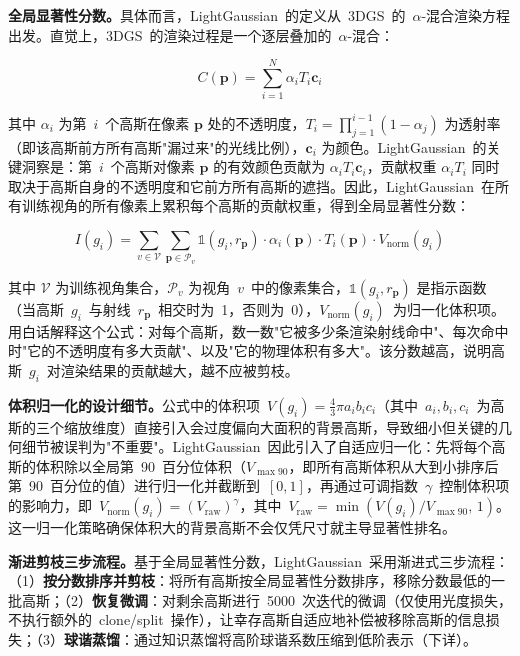 \textbf{全局显著性分数。}具体而言，LightGaussian~的定义从~3DGS~的~$\alpha$-混合渲染方程出发。直觉上，3DGS~的渲染过程是一个逐层叠加的~$\alpha$-混合：

\[
C(\mathbf{p}) = \sum_{i=1}^{N} \alpha_i T_i \mathbf{c}_i
\]

其中 $\alpha_i$ 为第~$i$~个高斯在像素 $\mathbf{p}$ 处的不透明度，$T_i = \prod_{j=1}^{i-1}(1-\alpha_j)$ 为透射率（即该高斯前方所有高斯"漏过来"的光线比例），$\mathbf{c}_i$ 为颜色。LightGaussian~的关键洞察是：第~$i$~个高斯对像素 $\mathbf{p}$ 的有效颜色贡献为 $\alpha_i T_i \mathbf{c}_i$，贡献权重 $\alpha_i T_i$ 同时取决于高斯自身的不透明度和它前方所有高斯的遮挡。因此，LightGaussian~在所有训练视角的所有像素上累积每个高斯的贡献权重，得到全局显著性分数：

\begin{equation}
I(g_i) = \sum_{v \in \mathcal{V}} \sum_{\mathbf{p} \in \mathcal{P}_v} \mathbb{1}(g_i, r_{\mathbf{p}}) \cdot \alpha_i(\mathbf{p}) \cdot T_i(\mathbf{p}) \cdot V_{\mathrm{norm}}(g_i)
\end{equation}

其中 $\mathcal{V}$ 为训练视角集合，$\mathcal{P}_v$ 为视角~$v$~中的像素集合，$\mathbb{1}(g_i, r_{\mathbf{p}})$ 是指示函数（当高斯~$g_i$~与射线~$r_{\mathbf{p}}$~相交时为~1，否则为~0），$V_{\mathrm{norm}}(g_i)$~为归一化体积项。用白话解释这个公式：对每个高斯，数一数"它被多少条渲染射线命中"、每次命中时"它的不透明度有多大贡献"、以及"它的物理体积有多大"。该分数越高，说明高斯~$g_i$~对渲染结果的贡献越大，越不应被剪枝。

\textbf{体积归一化的设计细节。}公式中的体积项~$V(g_i) = \frac{4}{3}\pi a_i b_i c_i$（其中~$a_i, b_i, c_i$~为高斯的三个缩放维度）直接引入会过度偏向大面积的背景高斯，导致细小但关键的几何细节被误判为"不重要"。LightGaussian~因此引入了自适应归一化：先将每个高斯的体积除以全局第~90~百分位体积（$V_{\max 90}$，即所有高斯体积从大到小排序后第~90~百分位的值）进行归一化并截断到~$[0, 1]$，再通过可调指数~$\gamma$~控制体积项的影响力，即~$V_{\mathrm{norm}}(g_i) = (V_{\mathrm{raw}})^\gamma$，其中~$V_{\mathrm{raw}} = \min(V(g_i)/V_{\max 90},\, 1)$。这一归一化策略确保体积大的背景高斯不会仅凭尺寸就主导显著性排名。

\textbf{渐进剪枝三步流程。}基于全局显著性分数，LightGaussian~采用渐进式三步流程：（1）\textbf{按分数排序并剪枝}：将所有高斯按全局显著性分数排序，移除分数最低的一批高斯；（2）\textbf{恢复微调}：对剩余高斯进行~5000~次迭代的微调（仅使用光度损失，不执行额外的~clone/split~操作），让幸存高斯自适应地补偿被移除高斯的信息损失；（3）\textbf{球谐蒸馏}：通过知识蒸馏将高阶球谐系数压缩到低阶表示（下详）。

